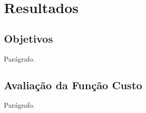 \chapter{Resultados}



\section{Objetivos}

Parágrafo.

\section{Avaliação da Função Custo}

Parágrafo.